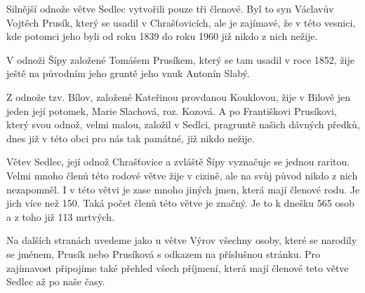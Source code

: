 \documentclass[../dejiny-rodu-prusiku.tex]{subfiles}
\begin{document}
Silnější odnože větve Sedlec vytvořili pouze tři členové. Byl to syn Václavův Vojtěch Prusík, který se usa­dil v Chrašťovicích, ale je zajímavé, že v této vesni­ci, kde potomci jeho byli od roku 1839 do roku 1960 již nikdo z nich nežije.

V odnoži Šípy založené Tomášem Prusíkem, který se tam usadil v roce 1852, žije ještě na původním jeho gruntě jeho vnuk Antonín Slabý.

Z odnože tzv. Bílov, založené Kateřinou provdanou Kouklovou, žije v Bilově jen jeden její potomek, Marie Slachová, roz. Kozová.
A po Františkovi Prusíkovi, který svou odnož, velmi malou, založil v Sedlci, pragruntě našich dávných předků, dnes již v této obci pro nás tak památné, již nikdo nežije.

Větev Sedlec, její odnož Chrašťovice a zvláště Šípy vyznačuje se jednou raritou. Velmi mnoho členů této rodové větve žije v cizině, ale na svůj původ nikdo z nich nezapomněl. I v této větvi je zase mnoho jiných jmen, která mají čle­nové rodu. Je jich více než 150. Taká počet členů této větve je značný. Je to k dnešku 565 osob a z toho již 113 mrtvých.

Na dalších stranách uvedeme jako u větve Výrov všechny osoby, které se narodily se jménem, Prusík nebo Prusíková s odkazem na příslušnou stránku. Pro zajímavost připojíme také přehled všech příjmení, která mají členové teto větve Sedlec až po naše časy.

\end{document}
